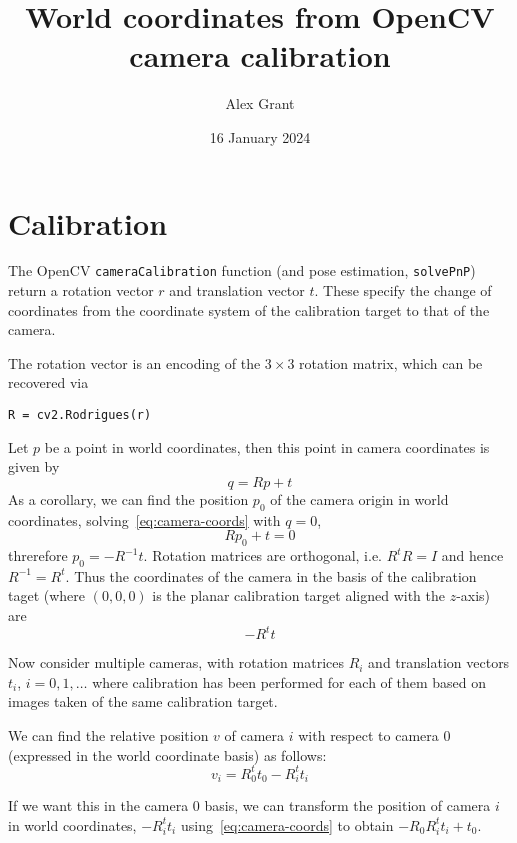 \documentclass{article}
\title{World coordinates from OpenCV camera calibration}
\author{Alex Grant}
\date{16 January 2024}
\begin{document}
\maketitle

\section{Calibration}

The OpenCV \texttt{cameraCalibration} function (and pose estimation, \texttt{solvePnP}) return a rotation vector $r$ and translation vector $t$. These specify the change of coordinates from the coordinate system of the calibration target to that of the camera.

The rotation vector is an encoding of the $3\times 3$ rotation matrix, which can be recovered via
\begin{verbatim}
R = cv2.Rodrigues(r)
\end{verbatim}

Let $p$ be a point in world coordinates, then this point in camera coordinates is given by
\begin{equation}
  \label{eq:camera-coords}
  q = Rp+t
\end{equation}
As a corollary, we can find the position $p_0$ of the camera origin in world coordinates, solving~\eqref{eq:camera-coords} with $q=0$,
\begin{equation*}
  Rp_0 + t = 0
\end{equation*}
threrefore $p_0 = -R^{-1}t$.
Rotation matrices are orthogonal, i.e. $R^t R = I$ and hence $R^{-1} = R^t$. Thus the coordinates of the camera in the basis of the calibration taget (where $(0,0,0)$ is the planar calibration target aligned with the $z$-axis) are
\begin{equation*}
  -R^t t
\end{equation*}

Now consider multiple cameras, with rotation matrices $R_i$ and translation vectors $t_i$, $i=0,1,\dots$ where calibration has been performed for each of them based on images taken of the same calibration target.

We can find the relative position $v$ of camera $i$ with respect to camera $0$ (expressed in the world coordinate basis) as follows:
\begin{equation*}
  v_i = R_0^t t_0 - R_i^t t_i
\end{equation*}

If we want this in the camera 0 basis, we can transform the position of camera $i$ in world coordinates, $-R_i^t t_i$ using~\eqref{eq:camera-coords} to obtain $-R_0 R_i^t t_i +t_0$.
\end{document}
